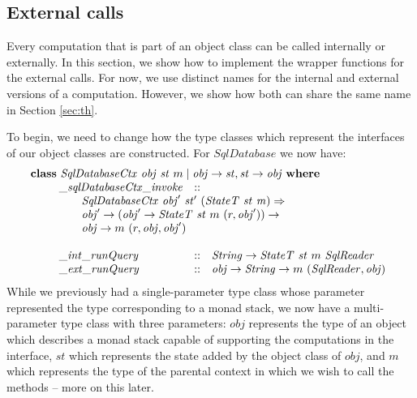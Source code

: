 \subsection{External calls}

Every computation that is part of an object class can be called internally or externally. In this section, we show how to implement the wrapper functions for the external calls. For now, we use distinct names for the internal and external versions of a computation. However, we show how both can share the same name in Section \ref{sec:th}. 

To begin, we need to change how the type classes which represent the interfaces of our object classes are constructed. For $\mathit{SqlDatabase}$ we now have:
\begin{displaymath}
\begin{array}{l}
\mathbf{class}~\mathit{SqlDatabaseCtx}~\mathit{obj}~\mathit{st}~m \mid \mathit{obj} \to \mathit{st}, \mathit{st} \to \mathit{obj}~\mathbf{where}\\
\qquad \begin{array}{lcl}
\mathit{\_\mathit{sqlDatabaseCtx\_invoke}} & :: & \\
\multicolumn{3}{l}{\qquad \mathit{SqlDatabaseCtx}~\mathit{obj}'~\mathit{st}'~(\mathit{StateT}~\mathit{st}~\mathit{m}) \Rightarrow}\\
\multicolumn{3}{l}{\qquad \mathit{obj}' \to (\mathit{obj}' \to \mathit{StateT}~\mathit{st}~m~(r,\mathit{obj}')) \to} \\
\multicolumn{3}{l}{\qquad \mathit{obj} \to m~(r,\mathit{obj},\mathit{obj}')} \\\\
\mathit{\_int\_runQuery} & :: & \mathit{String} \to \mathit{StateT}~\mathit{st}~m~\mathit{SqlReader} \\
\mathit{\_ext\_runQuery} & :: & \mathit{obj} \to \mathit{String} \to m~(\mathit{SqlReader}, \mathit{obj})
\end{array}
\end{array}
\end{displaymath}
While we previously had a single-parameter type class whose parameter represented the type corresponding to a monad stack, we now have a multi-parameter type class with three parameters: $\mathit{obj}$ represents the type of an object which describes a monad stack capable of supporting the computations in the interface, $\mathit{st}$ which represents the state added by the object class of $\mathit{obj}$, and $m$ which represents the type of the parental context in which we wish to call the methods -- more on this later. 

